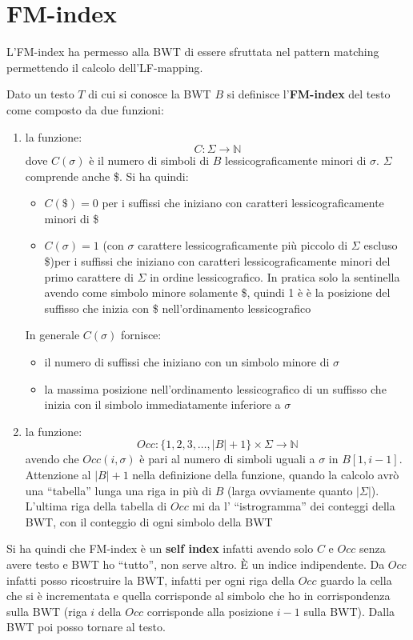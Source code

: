 \documentclass[a4paper,12pt, oneside]{book}
\begin{document}
\section{FM-index}
L'FM-index ha permesso alla BWT di essere sfruttata nel pattern matching
permettendo il calcolo dell'LF-mapping.
\begin{definizione}
  Dato un testo $T$ di cui si conosce la BWT $B$ si definisce
  l'\textbf{FM-index} del testo come composto da due funzioni:
  \begin{enumerate}
    \item la funzione:
    \[C:\Sigma\to \mathbb{N}\]
    dove $C(\sigma)$ è il numero di simboli di $B$ lessicograficamente minori di
    $\sigma$. $\Sigma$ comprende anche \$. Si ha quindi:
    \begin{itemize}
      \item $C(\$)=0$ per i suffissi che iniziano con caratteri
      lessicograficamente minori di \$
      \item $C(\sigma)=1$ (con $\sigma$ carattere lessicograficamente più
      piccolo di $\Sigma$ escluso \$)per i suffissi che iniziano con caratteri
      lessicograficamente minori del primo carattere di $\Sigma$ in ordine
      lessicografico. In pratica solo la sentinella avendo come simbolo minore
      solamente \$, quindi 1 è è la posizione del suffisso che inizia con \$
      nell’ordinamento lessicografico 
    \end{itemize}
    In generale $C(\sigma)$ fornisce:
    \begin{itemize}
      \item il numero di suffissi che iniziano con un simbolo minore di $\sigma$
      \item la massima
      posizione nell’ordinamento lessicografico di un suffisso che inizia con il
      simbolo immediatamente inferiore a $\sigma$    
    \end{itemize}
    \item la funzione:
    \[Occ:\{1,2,3,\ldots,|B|+1\}\times \Sigma\to \mathbb{N}\]
    avendo che $Occ(i,\sigma)$ è pari al numero di simboli uguali a $\sigma$ in
    $B[1,i-1]$. Attenzione al $|B|+1$ nella definizione della funzione, quando
    la calcolo avrò una ``tabella'' lunga una riga in più di $B$ (larga
    ovviamente quanto $|\Sigma|$). L'ultima riga
    della tabella di $Occ$ mi da l' ``istrogramma'' dei conteggi della BWT, con
    il conteggio di ogni simbolo della BWT
  \end{enumerate}
  Si ha quindi che FM-index è un \textbf{self index} infatti avendo solo $C$ e
  $Occ$ senza avere testo e BWT ho ``tutto'', non serve altro. È un indice
  indipendente. Da $Occ$ infatti posso ricostruire la BWT, infatti per ogni riga
  della $Occ$ guardo la cella che si è incrementata e quella corrisponde al
  simbolo che ho in corrispondenza sulla BWT (riga $i$ della $Occ$ corrisponde
  alla posizione $i-1$ sulla BWT). Dalla BWT poi posso tornare al testo. 
\end{definizione}
\end{document}
